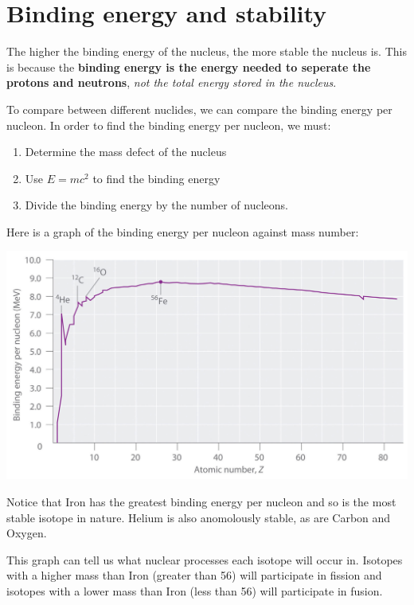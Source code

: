 \documentclass{article}
\begin{document}
\section*{Binding energy and stability}

The higher the binding energy of the nucleus, the more stable the nucleus is.
This is because the {\bf binding energy is the energy needed to seperate the
protons and neutrons}, {\it not the total energy stored in the nucleus}.

To compare between different nuclides, we can compare the binding energy per
nucleon. In order to find the binding energy per nucleon, we must:

\begin{enumerate}

	\item Determine the mass defect of the nucleus

	\item Use $E=mc^2$ to find the binding energy

	\item Divide the binding energy by the number of nucleons.

\end{enumerate}

Here is a graph of the binding energy per nucleon against mass number:

\begin{center}
	\includegraphics[scale=0.19]{bepn}
\end{center} 

Notice that Iron has the greatest binding energy per nucleon and so is the most
stable isotope in nature. Helium is also anomolously stable, as are Carbon and
Oxygen.

This graph can tell us what nuclear processes each isotope will occur in.
Isotopes with a higher mass than Iron (greater than 56) will participate in
fission and isotopes with a lower mass than Iron (less than 56) will participate
in fusion.
\end{document}
